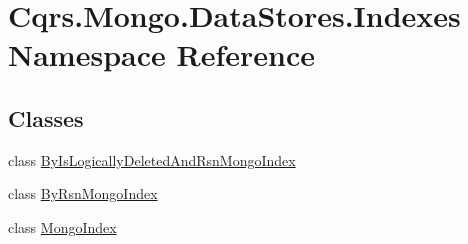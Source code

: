 \hypertarget{namespaceCqrs_1_1Mongo_1_1DataStores_1_1Indexes}{}\section{Cqrs.\+Mongo.\+Data\+Stores.\+Indexes Namespace Reference}
\label{namespaceCqrs_1_1Mongo_1_1DataStores_1_1Indexes}
\subsection*{Classes}
\begin{DoxyCompactItemize}
\item 
class \hyperlink{classCqrs_1_1Mongo_1_1DataStores_1_1Indexes_1_1ByIsLogicallyDeletedAndRsnMongoIndex}{By\+Is\+Logically\+Deleted\+And\+Rsn\+Mongo\+Index}
\item 
class \hyperlink{classCqrs_1_1Mongo_1_1DataStores_1_1Indexes_1_1ByRsnMongoIndex}{By\+Rsn\+Mongo\+Index}
\item 
class \hyperlink{classCqrs_1_1Mongo_1_1DataStores_1_1Indexes_1_1MongoIndex}{Mongo\+Index}
\end{DoxyCompactItemize}
